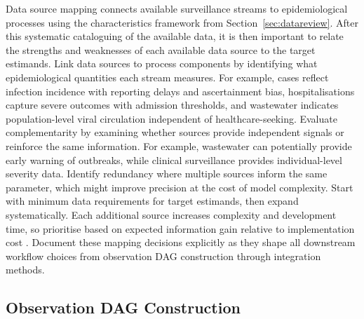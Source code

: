 \documentclass{article}
\begin{document}
Data source mapping connects available surveillance streams to epidemiological processes using the characteristics framework from Section~\ref{sec:datareview}.
After this systematic cataloguing of the available data,  it is then important to relate the strengths and weaknesses of each available data source to the target estimands.
Link data sources to process components by identifying what epidemiological quantities each stream measures. 
For example, cases reflect infection incidence with reporting delays and ascertainment bias, hospitalisations capture severe outcomes with admission thresholds, and wastewater indicates population-level viral circulation independent of healthcare-seeking.
Evaluate complementarity by examining whether sources provide independent signals or reinforce the same information.
For example, wastewater can potentially provide early warning of outbreaks, while clinical surveillance provides individual-level severity data.
Identify redundancy where multiple sources inform the same parameter, which might improve precision at the cost of model complexity.
Start with minimum data requirements for target estimands, then expand systematically.
Each additional source increases complexity and development time, so prioritise based on expected information gain relative to implementation cost \citep{jackson2019value,heath2024value}.
Document these mapping decisions explicitly as they shape all downstream workflow choices from observation DAG construction through integration methods.

\subsection{Observation DAG Construction} \label{sec:observation}
\end{document}
